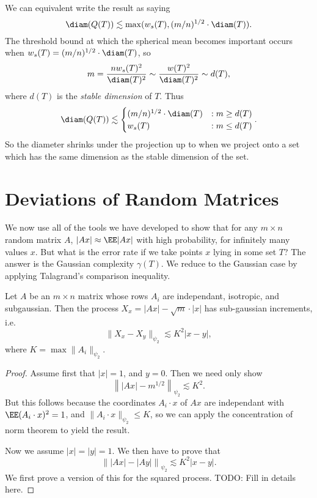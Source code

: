 We can equivalent write the result as saying
%
\[ \diam(Q(T)) \lesssim \max(w_s(T), (m/n)^{1/2} \cdot \diam(T) ). \]
%
The threshold bound at which the spherical mean becomes important occurs when $w_s(T) = (m/n)^{1/2} \cdot \diam(T)$, so
%
\[ m = \frac{n w_s(T)^2}{\diam(T)^2} \sim \frac{w(T)^2}{\diam(T)^2} \sim d(T), \]
%
where $d(T)$ is the {\it stable dimension} of $T$. Thus
%
\[ \diam(Q(T)) \lesssim \begin{cases} (m/n)^{1/2} \cdot \diam(T) & : m \geq d(T) \\ w_s(T) &: m \leq d(T) \end{cases}. \]
%
So the diameter shrinks under the projection up to when we project onto a set which has the same dimension as the stable dimension of the set.






\chapter{Deviations of Random Matrices}

We now use all of the tools we have developed to show that for any $m \times n$ random matrix $A$, $|Ax| \approx \EE |Ax|$ with high probability, for infinitely many values $x$. But what is the error rate if we take points $x$ lying in some set $T$? The answer is the Gaussian complexity $\gamma(T)$. We reduce to the Gaussian case by applying Talagrand's comparison inequality.

\begin{theorem}
	Let $A$ be an $m \times n$ matrix whose rows $A_i$ are independant, isotropic, and subgaussian. Then the process $X_x = |Ax| - \sqrt{m} \cdot |x|$ has sub-gaussian increments, i.e.
	\[ \| X_x - X_y \|_{\psi_2} \lesssim K^2 |x - y|, \]
	where $K = \max \| A_i \|_{\psi_2}$.
\end{theorem}
\begin{proof}
	Assume first that $|x| = 1$, and $y = 0$. Then we need only show
	\[ \left\| |Ax| - m^{1/2} \right\|_{\psi_2} \lesssim K^2. \]
	But this follows because the coordinates $A_i \cdot x$ of $Ax$ are independant with $\EE (A_i \cdot x)^2 = 1$, and $\| A_i \cdot x \|_{\psi_2} \leq K$, so we can apply the concentration of norm theorem to yield the result.

	Now we assume $|x| = |y| = 1$. We then have to prove that
	\[ \left\| |Ax| - |Ay| \right\|_{\psi_2} \lesssim K^2 |x - y|. \]
	We first prove a version of this for the squared process. TODO: Fill in details here.
\end{proof}


